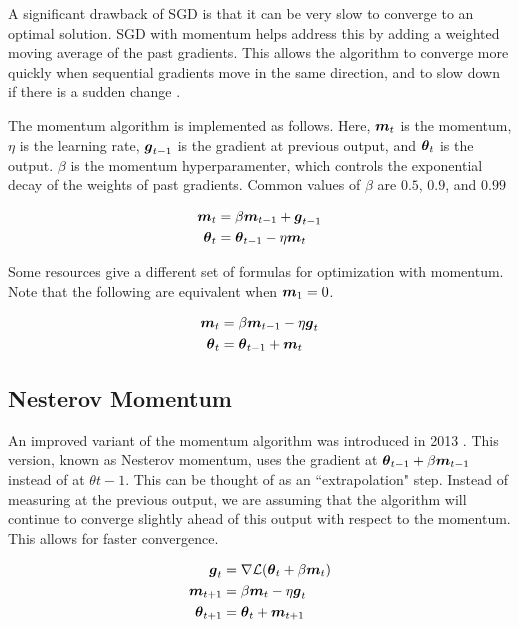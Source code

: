 \documentclass{article}
\begin{document}
A significant drawback of SGD is that it can be very slow to converge to an optimal solution. SGD with momentum helps address this by adding a weighted moving average of the past gradients. This allows the algorithm to converge more quickly when sequential gradients move in the same direction, and to slow down if there is a sudden change \cite{pml1book}. 

The momentum algorithm is implemented as follows. Here, \(\vb*{m}_t\) is the momentum, \(\eta\) is the learning rate, \(\vb*{g}_{t-1}\) is the gradient at previous output, and \(\vb*{\theta}_t\) is the output. \(\beta\) is the momentum hyperparamenter, which controls the exponential decay of the weights of past gradients. Common values of \(\beta\) are \(0.5\), \(0.9\), and \(0.99\) \cite{pml1book}



\begin{align*}
    \vb*{m}_t &= \beta \vb*{m}_{t-1} + \vb*{g}_{t-1} \\
    \vb*{\theta}_t &= \vb*{\theta}_{t-1} - \eta \vb*{m}_t
\end{align*}


Some resources give a different set of formulas for optimization with momentum. Note that the following are equivalent when \(\vb*{m}_1 = 0\).

\begin{align*}
    \vb*{m}_t &= \beta \vb*{m}_{t-1} - \eta \vb*{g}_t \\
    \vb*{\theta}_t &= \vb*{\theta}_{t-1} + \vb*{m}_t
\end{align*}

\subsection{Nesterov Momentum}

An improved variant of the momentum algorithm was introduced in 2013 \cite{sutskever13}. This version, known as Nesterov momentum, uses the gradient at \(\vb*{\theta}_{t-1} + \beta \vb*{m}_{t-1}\) instead of at \(\theta{t-1}\). This can be thought of as an ``extrapolation" step. Instead of measuring at the previous output, we are assuming that the algorithm will continue to converge slightly ahead of this output with respect to the momentum. This allows for faster convergence.

\begin{align*}
    \vb*{g}_{t} &= \nabla \mathcal{L} (\vb*{\theta}_{t} + \beta \vb*{m}_{t}) \\
    \vb*{m}_{t+1} &= \beta \vb*{m}_{t} - \eta \vb*{g}_t \\
    \vb*{\theta}_{t+1} &= \vb*{\theta}_t + \vb*{m}_{t+1}
\end{align*}
\end{document}
